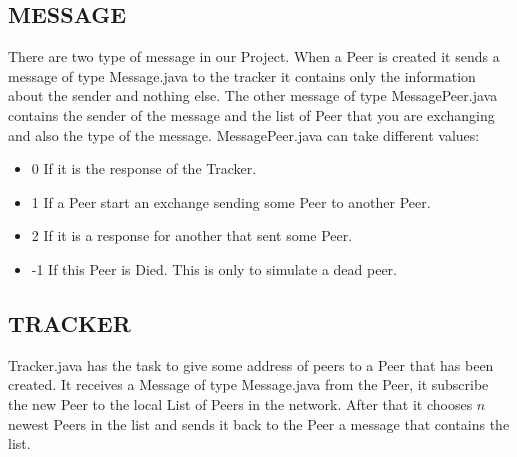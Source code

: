 \documentclass[a4paper,12pt,notitlepage]{article} %
\begin{document}
\subsection{MESSAGE}
	There are two type of message in our Project. When a Peer is 	created it sends a message of type Message.java to 
the tracker it contains only the information about the sender and nothing else. The other message of type MessagePeer.java 
contains the sender of the message and the list of Peer that you are exchanging and also the type of the message. 
MessagePeer.java can take different values:
\begin{itemize}
  \item 0 If it is the response of the Tracker.
  \item 1 If a Peer start an exchange sending some Peer to another Peer.
  \item 2 If it is a response for another that sent some Peer.
  \item -1 If this Peer is Died. This is only to simulate a dead peer.
\end{itemize}

\subsection{TRACKER}
	Tracker.java has the task to give some address of peers to a Peer that has been created. It receives a Message of 
type Message.java from the Peer, it subscribe the new Peer to the local List of Peers in the network. After that it chooses 
\(n\) newest Peers in the list and sends it back to the Peer a message that contains the list.
\end{document}
